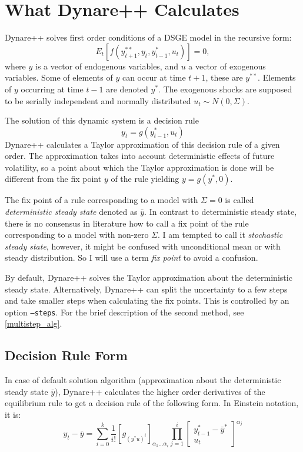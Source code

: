 \documentclass[10pt]{article}
\begin{document}
\section{What Dynare++ Calculates}
\label{dynpp_calc}

Dynare++ solves first order conditions of a DSGE model in the recursive form:
\begin{equation}\label{focs}
E_t[f(y^{**}_{t+1},y_t,y^*_{t-1},u_t)]=0,
\end{equation}
where $y$ is a vector of endogenous variables, and $u$ a vector of
exogenous variables. Some of elements of $y$ can occur at time $t+1$,
these are $y^{**}$. Elements of $y$ occurring at time $t-1$ are denoted
$y^*$. The exogenous shocks are supposed to be serially independent
and normally distributed $u_t\sim N(0,\Sigma)$.

The solution of this dynamic system is a decision rule
\[
y_t=g(y^*_{t-1},u_t)
\]
Dynare++ calculates a Taylor approximation of this decision rule of a
given order. The approximation takes into account deterministic
effects of future volatility, so a point about which the Taylor
approximation is done will be different from the fix point $y$ of the rule
yielding $y=g(y^*,0)$.

The fix point of a rule corresponding to a model with $\Sigma=0$ is
called {\it deterministic steady state} denoted as $\bar y$. In
contrast to deterministic steady state, there is no consensus in
literature how to call a fix point of the rule corresponding to a
model with non-zero $\Sigma$. I am tempted to call it {\it stochastic
  steady state}, however, it might be confused with unconditional mean
or with steady distribution. So I will use a term {\it fix point} to
avoid a confusion.

By default, Dynare++ solves the Taylor approximation about the
deterministic steady state. Alternatively, Dynare++ can split the
uncertainty to a few steps and take smaller steps when calculating the
fix points. This is controlled by an option {\tt --steps}. For the
brief description of the second method, see \ref{multistep_alg}.

\subsection{Decision Rule Form}
\label{dr_form}

In case of default solution algorithm (approximation about the
deterministic steady state $\bar y$), Dynare++ calculates the higher
order derivatives of the equilibrium rule to get a decision rule of
the following form. In Einstein notation, it is:
\[
y_t-\bar y = \sum_{i=0}^k\frac{1}{i!}\left[g_{(y^*u)^i}\right]
_{\alpha_1\ldots\alpha_i}
\prod_{j=1}^i\left[\begin{array}{c} y^*_{t-1}-\bar y^*\\ u_t \end{array}\right]
^{\alpha_j}
\]
\end{document}
